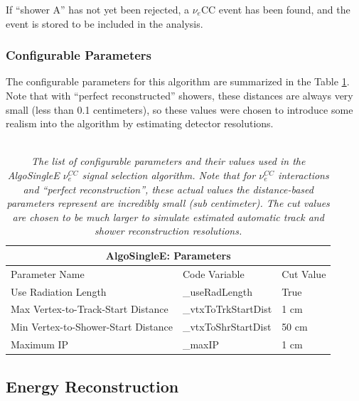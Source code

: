 If ``shower A'' has not yet been rejected, a $\nu_e$CC event has been found, and the event is stored to be included in the analysis.

\subsubsection{Configurable Parameters}
The configurable parameters for this algorithm are summarized in the Table \ref{algosinglee_table}. Note that with ``perfect reconstructed'' showers, these distances are always very small (less than 0.1 centimeters), so these values were chosen to introduce some realism into the algorithm by estimating detector resolutions.\\\\

\begin{table}
\begin{tabular}{ |p{8cm}|p{3.5cm}|p{1.5cm}|  }
 \hline
 \multicolumn{3}{|c|}{AlgoSingleE: Parameters} \\
 \hline
 Parameter Name & Code Variable & Cut Value \\
 \hline \hline
 Use Radiation Length & \_useRadLength & True\\\hline
 
 Max Vertex-to-Track-Start Distance & \_vtxToTrkStartDist & 1 cm \\\hline

 Min Vertex-to-Shower-Start Distance & \_vtxToShrStartDist & 50 cm \\\hline

 Maximum IP & \_maxIP & 1 cm \\\hline

 \hline
\end{tabular}
\caption{\textit{The list of configurable parameters and their values used in the AlgoSingleE $\nu_e^{CC}$ signal selection algorithm. Note that for $\nu_e^{CC}$ interactions and ``perfect reconstruction'', these actual values the distance-based parameters represent are incredibly small (sub centimeter). The cut values are chosen to be much larger to simulate estimated automatic track and shower reconstruction resolutions.}}\label{algosinglee_table}
\end{table}










\subsection{Energy Reconstruction}\label{LEE_EnergyReco_section}

